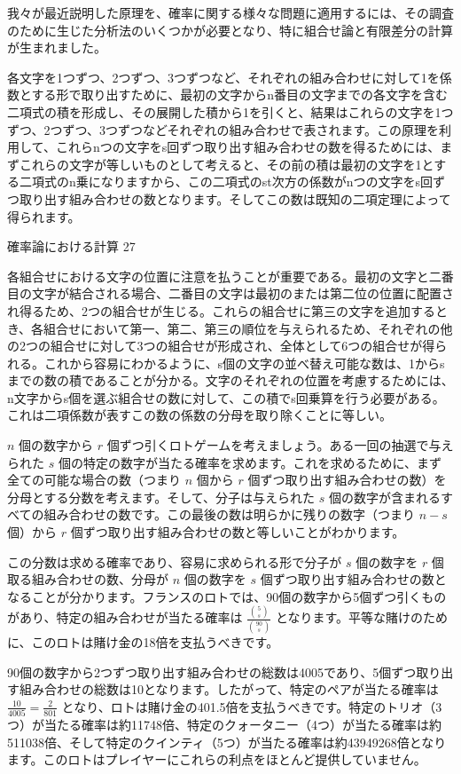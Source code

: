 \documentclass[a4paper,11pt,openany]{ltjsbook}
\begin{document}
我々が最近説明した原理を、確率に関する様々な問題に適用するには、その調査のために生じた分析法のいくつかが必要となり、特に組合せ論と有限差分の計算が生まれました。

各文字を1つずつ、2つずつ、3つずつなど、それぞれの組み合わせに対して1を係数とする形で取り出すために、最初の文字からn番目の文字までの各文字を含む二項式の積を形成し、その展開した積から1を引くと、結果はこれらの文字を1つずつ、2つずつ、3つずつなどそれぞれの組み合わせで表されます。この原理を利用して、これらnつの文字をs回ずつ取り出す組み合わせの数を得るためには、まずこれらの文字が等しいものとして考えると、その前の積は最初の文字を1とする二項式のn乗になりますから、この二項式のst次方の係数がnつの文字をs回ずつ取り出す組み合わせの数となります。そしてこの数は既知の二項定理によって得られます。

確率論における計算 27

各組合せにおける文字の位置に注意を払うことが重要である。最初の文字と二番目の文字が結合される場合、二番目の文字は最初のまたは第二位の位置に配置され得るため、2つの組合せが生じる。これらの組合せに第三の文字を追加するとき、各組合せにおいて第一、第二、第三の順位を与えられるため、それぞれの他の2つの組合せに対して3つの組合せが形成され、全体として6つの組合せが得られる。これから容易にわかるように、s個の文字の並べ替え可能な数は、1からsまでの数の積であることが分かる。文字のそれぞれの位置を考慮するためには、n文字からs個を選ぶ組合せの数に対して、この積でs回乗算を行う必要がある。これは二項係数が表すこの数の係数の分母を取り除くことに等しい。

$n$ 個の数字から $r$ 個ずつ引くロトゲームを考えましょう。ある一回の抽選で与えられた $s$ 個の特定の数字が当たる確率を求めます。これを求めるために、まず全ての可能な場合の数（つまり $n$ 個から $r$ 個ずつ取り出す組み合わせの数）を分母とする分数を考えます。そして、分子は与えられた $s$ 個の数字が含まれるすべての組み合わせの数です。この最後の数は明らかに残りの数字（つまり $n-s$ 個）から $r$ 個ずつ取り出す組み合わせの数と等しいことがわかります。

この分数は求める確率であり、容易に求められる形で分子が $s$ 個の数字を $r$ 個取る組み合わせの数、分母が $n$ 個の数字を $s$ 個ずつ取り出す組み合わせの数となることが分かります。フランスのロトでは、90個の数字から5個ずつ引くものがあり、特定の組み合わせが当たる確率は $\frac{\binom{5}{s}}{\binom{90}{s}}$ となります。平等な賭けのために、このロトは賭け金の18倍を支払うべきです。

90個の数字から2つずつ取り出す組み合わせの総数は4005であり、5個ずつ取り出す組み合わせの総数は10となります。したがって、特定のペアが当たる確率は $\frac{10}{4005} = \frac{2}{801}$ となり、ロトは賭け金の401.5倍を支払うべきです。特定のトリオ（3つ）が当たる確率は約11748倍、特定のクォータニー（4つ）が当たる確率は約511038倍、そして特定のクインティ（5つ）が当たる確率は約43949268倍となります。このロトはプレイヤーにこれらの利点をほとんど提供していません。
\end{document}
